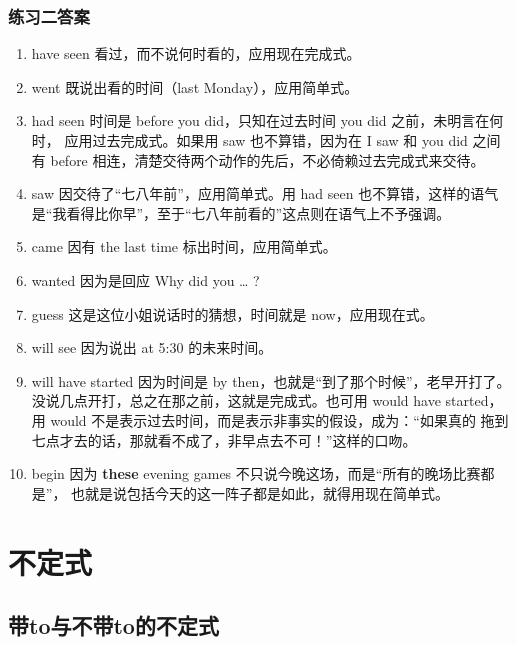 \subsection{练习二答案}

\begin{enumerate}
\item have seen 看过，而不说何时看的，应用现在完成式。

\item went 既说出看的时间（last Monday），应用简单式。

\item had seen 时间是 before you did，只知在过去时间 you did 之前，未明言在何时，
  应用过去完成式。如果用 saw 也不算错，因为在 I saw 和 you did 之间有 before
  相连，清楚交待两个动作的先后，不必倚赖过去完成式来交待。

\item saw 因交待了“七八年前”，应用简单式。用 had seen 也不算错，这样的语气
  是“我看得比你早”，至于“七八年前看的”这点则在语气上不予强调。

\item came 因有 the last time 标出时间，应用简单式。

\item wanted 因为是回应 Why did you \ldots{} ?

\item guess 这是这位小姐说话时的猜想，时间就是 now，应用现在式。

\item will see 因为说出 at 5:30 的未来时间。

\item will have started 因为时间是 by then，也就是“到了那个时候”，老早开打了。
  没说几点开打，总之在那之前，这就是完成式。也可用 would have
  started，用 would 不是表示过去时间，而是表示非事实的假设，成为：“如果真的
  拖到七点才去的话，那就看不成了，非早点去不可！”这样的口吻。

\item begin 因为 \textbf{these} evening games 不只说今晚这场，而是“所有的晚场比赛都是”，
  也就是说包括今天的这一阵子都是如此，就得用现在简单式。
\end{enumerate}

\chapter{不定式}

\section{带to与不带to的不定式}

